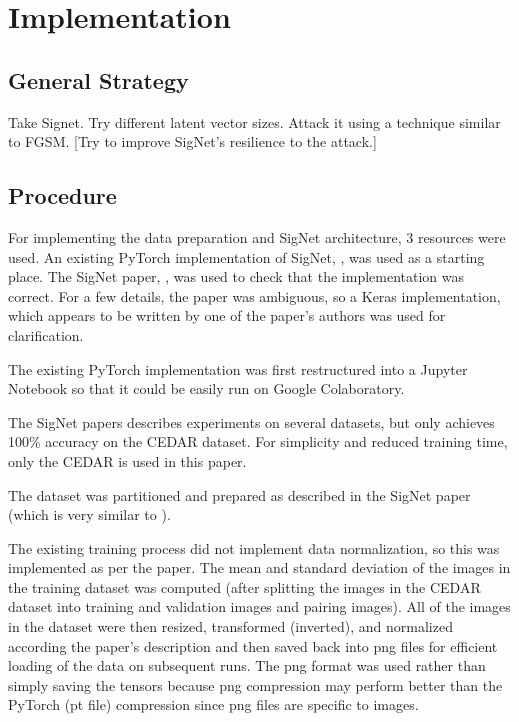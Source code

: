 \section{Implementation}\label{sec:implementation}


\subsection{General Strategy}

Take Signet.
Try different latent vector sizes.
Attack it using a technique similar to FGSM.
[Try to improve SigNet's resilience to the attack.]


\subsection{Procedure}

For implementing the data preparation and SigNet architecture, 3 resources were used.
An existing PyTorch implementation of SigNet, \cite{GitHub_signet_pytorch}, was used as a starting place.
The SigNet paper, \cite{sig_net}, was used to check that the implementation was correct.
For a few details, the paper was ambiguous, so a Keras implementation, \cite{GitHub_sounakdey} which appears to be written by one of the paper's authors was used for clarification.

The existing PyTorch implementation was first restructured into a Jupyter Notebook so that it could be easily run on Google Colaboratory.

The SigNet papers describes experiments on several datasets, but only achieves 100\% accuracy on the CEDAR dataset.
For simplicity and reduced training time, only the CEDAR is used in this paper.

The dataset was partitioned and prepared as described in the SigNet paper (which is very similar to \cite{LeCun}).

The existing training process did not implement data normalization, so this was implemented as per the paper.
The mean and standard deviation of the images in the training dataset was computed (after splitting the images in the CEDAR dataset into training and validation images and pairing images).
All of the images in the dataset were then resized, transformed (inverted), and normalized according the paper's description and then saved back into png files for efficient loading of the data on subsequent runs.
The png format was used rather than simply saving the tensors because png compression may perform better than the PyTorch (pt file) compression since png files are specific to images.

